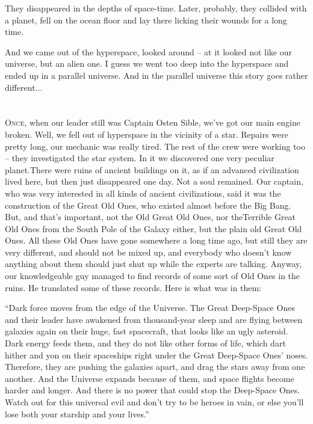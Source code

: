 \documentclass[ebook,oneside,final,openright]{memoir}
\begin{document}
They disappeared in the depths of space-time. Later, probably, they collided with a planet, fell on the ocean floor and lay there licking their wounds for a long time.\par
And we came out of the hyperspace, looked around – at it looked not like our universe, but an alien one. I guess we went too deep into the hyperspace and ended up in a parallel universe. And in the parallel universe this story goes rather different...
\chapter{}
\par
\lettrine{O}{nce,} when our leader still was Captain Osten Sible, we’ve got our main engine broken. Well, we fell out of hyperspace in the vicinity of a star. Repairs were pretty long, our mechanic was really tired. The rest of the crew were working too – they investigated the star system. In it we discovered one very peculiar planet.There were ruins of ancient buildings on it, as if an advanced civilization lived here, but then just disappeared one day. Not a soul remained. Our captain, who was very interested in all kinds of ancient civilizations, said it was the construction of the Great Old Ones, who existed almost before the Big Bang. But, and that’s important, not the Old Great Old Ones, nor theTerrible Great Old Ones from the South Pole of the Galaxy either, but the plain old Great Old Ones. All these Old Ones have gone somewhere a long time ago, but still they are very different, and should not be mixed up, and everybody who doesn’t know anything about them should just shut up while the experts are talking. Anyway, our knowledgeable guy managed to find records of some sort of Old Ones in the ruins. He translated some of these records. Here is what was in them:\par
\par
“Dark force moves from the edge of the Universe. The Great Deep-Space Ones and their leader have awakened from thousand-year sleep and are flying between galaxies again on their huge, fast spacecraft, that looks like an ugly asteroid. Dark energy feeds them, and they do not like other forms of life, which dart hither and yon on their spaceships right under the Great Deep-Space Ones’ noses. Therefore, they are pushing the galaxies apart, and drag the stars away from one another. And the Universe expands because of them, and space flights become harder and longer. And there is no power that could stop the Deep-Space Ones. Watch out for this universal evil and don’t try to be heroes in vain, or else you’ll lose both your starship and your lives.”\par
\end{document}
